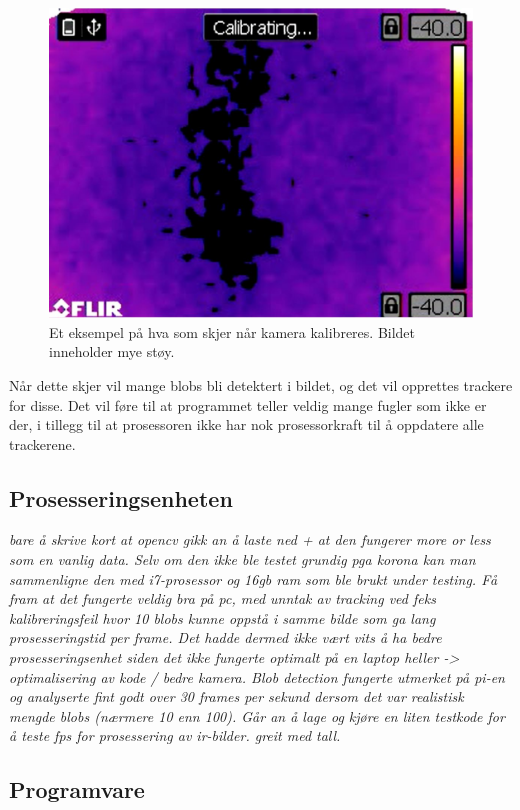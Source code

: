 \begin{figure}[H]
    \centering
    \includegraphics[width=.5\textwidth]{verifikasjon-test/Kamera/kalibrering.jpg}
    \caption{Et eksempel på hva som skjer når kamera kalibreres. Bildet inneholder mye støy.}
    \label{fig:verifikasjon:kalibrering}
\end{figure}

Når dette skjer vil mange blobs bli detektert i bildet, og det vil opprettes trackere for disse. 
Det vil føre til at programmet teller veldig mange fugler som ikke er der, i tillegg til at prosessoren ikke har nok prosessorkraft til å oppdatere alle trackerene. 


\subsection{Prosesseringsenheten}

\textit{bare å skrive kort at opencv gikk an å laste ned + at den fungerer more or less som en vanlig data. Selv om den ikke ble testet grundig pga korona kan man sammenligne den med i7-prosessor og 16gb ram som ble brukt under testing. Få fram at det fungerte veldig bra på pc, med unntak av tracking ved feks kalibreringsfeil hvor 10 blobs kunne oppstå i samme bilde som ga lang prosesseringstid per frame. Det hadde dermed ikke vært vits å ha bedre prosesseringsenhet siden det ikke fungerte optimalt på en laptop heller -> optimalisering av kode / bedre kamera. Blob detection fungerte utmerket på pi-en og analyserte fint godt over 30 frames per sekund dersom det var realistisk mengde blobs (nærmere 10 enn 100). Går an å lage og kjøre en liten testkode for å teste fps for prosessering av ir-bilder. greit med tall.}



\subsection{Programvare}\label{sec:verifikasjon:programvare}

